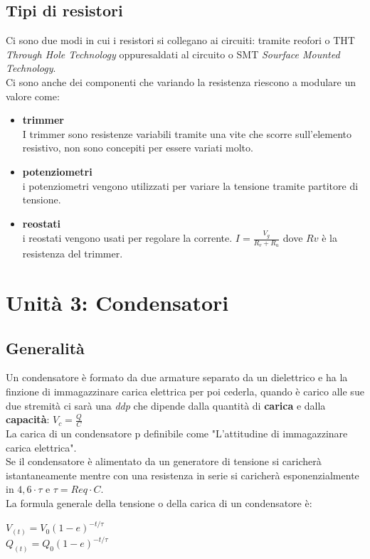 \documentclass{article}
\begin{document}
\subsection{Tipi di resistori}
Ci sono due modi in cui i resistori si collegano ai circuiti: tramite reofori o THT \textit{Through Hole Technology} oppuresaldati al circuito o SMT \textit{Sourface Mounted Technology}.
\vspace{1\baselineskip}
\\Ci sono anche dei componenti che variando la resistenza riescono a modulare un valore come:
\begin{itemize}
    \item \textbf{trimmer}\\
    I trimmer sono resistenze variabili tramite una vite che scorre sull'elemento resistivo, non sono concepiti per essere variati molto.
    \item \textbf{potenziometri}\\
    i potenziometri vengono utilizzati per variare la tensione tramite partitore di tensione.
    \item \textbf{reostati}\\
    i reostati vengono usati per regolare la corrente. $I=\frac{V_g}{R_v+R_u}$ dove $Rv$ è la resistenza del trimmer.
\end{itemize}

\section{Unità 3: Condensatori}
\subsection{Generalità}
Un condensatore è formato da due armature separato da un dielettrico e ha la finzione di immagazzinare carica elettrica per poi cederla, quando è carico alle sue due stremità ci sarà una \textit{ddp} che dipende dalla quantità di \textbf{carica} e dalla \textbf{capacità}: $V_c=\frac{Q}{C}$\\
La carica di un condensatore p definibile come "L'attitudine di immagazzinare carica elettrica".\\
Se il condensatore è alimentato da un generatore di tensione si caricherà istantaneamente mentre con una resistenza in serie si caricherà esponenzialmente in $4,6\cdot\tau$ e $\tau=Req\cdot C$.\\
La formula generale della tensione o della carica di un condensatore è:
\begin{center}
    $V_{(t)}=V_{0}(1-e)^{-t/\tau}$\\
    $Q_{(t)}=Q_{0}(1-e)^{-t/\tau}$
\end{center}
\end{document}
